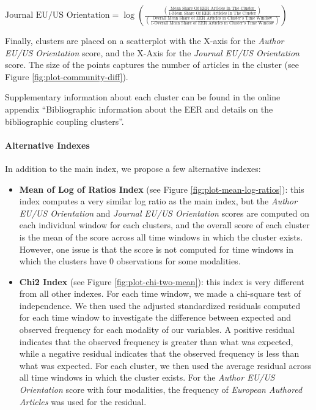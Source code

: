 \documentclass[
  12pt,
  onecolumn]{article}
\providecommand{\tightlist}{%
  \setlength{\itemsep}{0pt}\setlength{\parskip}{0pt}}
\begin{document}
\bigskip

\({\scriptstyle \text{Journal EU/US Orientation}=\log(\frac{(\frac{\text{Mean Share Of EER Articles In The Cluster}}{\text{1-Mean Share Of EER Articles In The Cluster}})} {(\frac{\text{Overall Mean Share of EER Articles in Cluster's Time Window}}{\text{1-Overall Mean Share of EER Articles in Cluster's Time Window}})})}\)
\bigskip

Finally, clusters are placed on a scatterplot with the X-axis for the
\emph{Author EU/US Orientation} score, and the X-Axis for the
\emph{Journal EU/US Orientation} score. The size of the points captures
the number of articles in the cluster (see Figure
\ref{fig:plot-community-diff}).

Supplementary information about each cluster can be found in the online
appendix ``Bibliographic information about the EER and details on the
bibliographic coupling clusters''.

\hypertarget{alt-index}{%
\paragraph*{Alternative Indexes}\label{alt-index}}

In addition to the main index, we propose a few alternative indexes:

\begin{itemize}
\tightlist
\item
  \textbf{Mean of Log of Ratios Index} (see Figure
  \ref{fig:plot-mean-log-ratios}): this index computes a very similar
  log ratio as the main index, but the \emph{Author EU/US Orientation}
  and \emph{Journal EU/US Orientation} scores are computed on each
  individual window for each clusters, and the overall score of each
  cluster is the mean of the score across all time windows in which the
  cluster exists. However, one issue is that the score is not computed
  for time windows in which the clusters have 0 observations for some
  modalities.
\item
  \textbf{Chi2 Index} (see Figure \ref{fig:plot-chi-two-mean}): this
  index is very different from all other indexes. For each time window,
  we made a chi-square test of independence. We then used the adjusted
  standardized residuals computed for each time window to investigate
  the difference between expected and observed frequency for each
  modality of our variables. A positive residual indicates that the
  observed frequency is greater than what was expected, while a negative
  residual indicates that the observed frequency is less than what was
  expected. For each cluster, we then used the average residual across
  all time windows in which the cluster exists. For the \emph{Author
  EU/US Orientation} score with four modalities, the frequency of
  \emph{European Authored Articles} was used for the residual.
\end{itemize}
\end{document}
